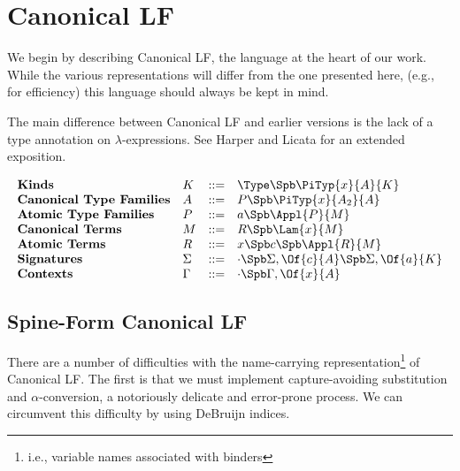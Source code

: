 

\section{Canonical LF}
We begin by describing Canonical LF, the language at the heart of our
work.  While the various representations will differ from the one presented here, 
(e.g., for efficiency) this language should always be kept in mind.

The main difference between Canonical LF and earlier versions
is the lack of a type annotation on $\lambda$-expressions.
See Harper and Licata\cite{Harper:2006:Mechanizing} for an extended
exposition.

$$
\begin{array}{llll}
\textbf{Kinds} & K & ::= & \Type \Spb \PiTyp{x}{A}{K} \\
\textbf{Canonical Type Families} & A & ::= & P \Spb \PiTyp{x}{A_2}{A} \\
\textbf{Atomic Type Families} & P & ::= & a \Spb \Appl{P}{M} \\
\textbf{Canonical Terms} & M & ::= & R \Spb \Lam{x}{M} \\
\textbf{Atomic Terms} & R & ::= &  x \Spb c \Spb \Appl{R}{M}\\
\textbf{Signatures} & \Sigma & ::= & \cdot \Spb \Sigma,\Of{c}{A} 
\Spb \Sigma,\Of{a}{K}\\
\textbf{Contexts} & \Gamma & ::= & \cdot \Spb \Gamma,\Of{x}{A}\\
\end{array}
$$


\subsection{Spine-Form Canonical LF}

There are a number of difficulties with the name-carrying 
representation\footnote{i.e., variable names associated with binders}
of Canonical LF.  The first is that we must
implement capture-avoiding substitution and $\alpha$-conversion,
a notoriously delicate and error-prone process.
We can circumvent this difficulty
by using DeBruijn indices\cite{DeBruijn:1972:Terms}. 

